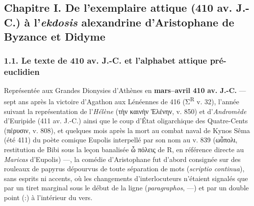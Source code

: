 \documentclass[11pt, a4paper, twoside]{article}
\renewcommand{\_}{\origunderscore\penalty0\relax}
\renewcommand{\texttt}[1]{#1}
\newcommand{\R}{\textbf{R}}
\newcommand{\Bibi}{\textit{Bibi}}
\def\R{R}%
\def\Bibi{Bibi}%
\begin{document}
\subsection{Chapitre I. De l'exemplaire attique (410 av. J.-C.) à l'\textit{ekdosis} alexandrine d'Aristophane de Byzance et Didyme}


\subsubsection{1.1. Le texte de 410 av. J.-C. et l'alphabet attique pré-euclidien}

Représentée aux Grandes Dionysies d'Athènes en \textbf{mars–avril 410 av. J.-C.} — sept ans après la victoire d'Agathon aux Lénéennes de 416 (Σ\textsuperscript{R} v. 32), l'année suivant la représentation de l'\textit{Hélène} (\texttt{τὴν καινὴν Ἑλένην}, v. 850) et d'\textit{Andromède} d'Euripide (411 av. J.-C.) ainsi que le coup d'État oligarchique des Quatre-Cents (\texttt{πέρυσιν}, v. 808), et quelques mois après la mort au combat naval de Kynos Sêma (été 411) du poète comique Eupolis interpellé par son nom au v. 839 (\texttt{ωὖπολι}, restitution de \Bibi{} sous la leçon banalisée \texttt{ὦ πόλεις} de \R{}, en référence directe au \textit{Maricas} d'Eupolis) —, la comédie d'Aristophane fut d'abord consignée sur des rouleaux de papyrus dépourvus de toute séparation de mots (\textit{scriptio continua}), sans esprits ni accents, où les changements d'interlocuteurs n'étaient signalés que par un tiret marginal sous le début de la ligne (\textit{paragraphos}, \texttt{—}) et par un double point (\texttt{:}) à l'intérieur du vers.
\end{document}
